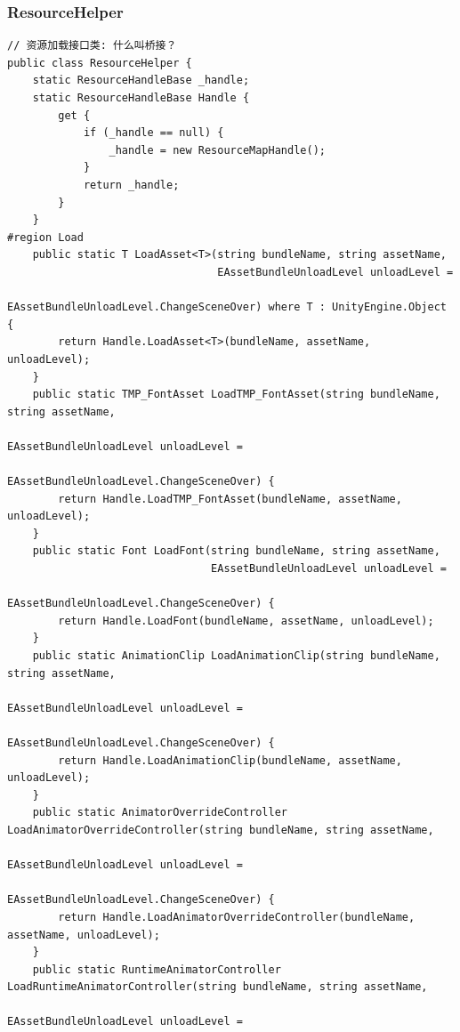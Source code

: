 \documentclass[9pt, b5paper]{article}
\begin{document}
\subsubsection{ResourceHelper}
\label{sec-9-1-2}
\begin{verbatim}
// 资源加载接口类: 什么叫桥接？
public class ResourceHelper {
    static ResourceHandleBase _handle;
    static ResourceHandleBase Handle {
        get {
            if (_handle == null) {
                _handle = new ResourceMapHandle();
            }
            return _handle;
        }
    }
#region Load
    public static T LoadAsset<T>(string bundleName, string assetName, 
                                 EAssetBundleUnloadLevel unloadLevel = 
                                 EAssetBundleUnloadLevel.ChangeSceneOver) where T : UnityEngine.Object {
        return Handle.LoadAsset<T>(bundleName, assetName, unloadLevel);
    }
    public static TMP_FontAsset LoadTMP_FontAsset(string bundleName, string assetName, 
                                                  EAssetBundleUnloadLevel unloadLevel = 
                                                  EAssetBundleUnloadLevel.ChangeSceneOver) {
        return Handle.LoadTMP_FontAsset(bundleName, assetName, unloadLevel);
    }
    public static Font LoadFont(string bundleName, string assetName, 
                                EAssetBundleUnloadLevel unloadLevel = 
                                EAssetBundleUnloadLevel.ChangeSceneOver) {
        return Handle.LoadFont(bundleName, assetName, unloadLevel);
    }
    public static AnimationClip LoadAnimationClip(string bundleName, string assetName, 
                                                  EAssetBundleUnloadLevel unloadLevel = 
                                                  EAssetBundleUnloadLevel.ChangeSceneOver) {
        return Handle.LoadAnimationClip(bundleName, assetName, unloadLevel);
    }
    public static AnimatorOverrideController LoadAnimatorOverrideController(string bundleName, string assetName, 
                                                                            EAssetBundleUnloadLevel unloadLevel = 
                                                                            EAssetBundleUnloadLevel.ChangeSceneOver) {
        return Handle.LoadAnimatorOverrideController(bundleName, assetName, unloadLevel);
    }
    public static RuntimeAnimatorController LoadRuntimeAnimatorController(string bundleName, string assetName, 
                                                                          EAssetBundleUnloadLevel unloadLevel = 

\end{verbatim}
\end{document}
